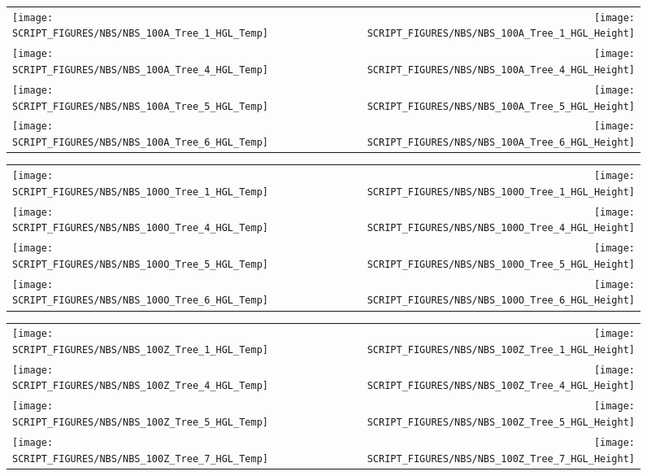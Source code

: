 \begin{figure}[p]
\begin{tabular*}{\textwidth}{l@{\extracolsep{\fill}}r}
\texttt{[image: SCRIPT\_FIGURES/NBS/NBS\_100A\_Tree\_1\_HGL\_Temp]} &
\texttt{[image: SCRIPT\_FIGURES/NBS/NBS\_100A\_Tree\_1\_HGL\_Height]} \\
\texttt{[image: SCRIPT\_FIGURES/NBS/NBS\_100A\_Tree\_4\_HGL\_Temp]} &
\texttt{[image: SCRIPT\_FIGURES/NBS/NBS\_100A\_Tree\_4\_HGL\_Height]} \\
\texttt{[image: SCRIPT\_FIGURES/NBS/NBS\_100A\_Tree\_5\_HGL\_Temp]} &
\texttt{[image: SCRIPT\_FIGURES/NBS/NBS\_100A\_Tree\_5\_HGL\_Height]}\\
\texttt{[image: SCRIPT\_FIGURES/NBS/NBS\_100A\_Tree\_6\_HGL\_Temp]} &
\texttt{[image: SCRIPT\_FIGURES/NBS/NBS\_100A\_Tree\_6\_HGL\_Height]}
\end{tabular*}
\end{figure}

\begin{figure}[p]
\begin{tabular*}{\textwidth}{l@{\extracolsep{\fill}}r}
\texttt{[image: SCRIPT\_FIGURES/NBS/NBS\_100O\_Tree\_1\_HGL\_Temp]} &
\texttt{[image: SCRIPT\_FIGURES/NBS/NBS\_100O\_Tree\_1\_HGL\_Height]} \\
\texttt{[image: SCRIPT\_FIGURES/NBS/NBS\_100O\_Tree\_4\_HGL\_Temp]} &
\texttt{[image: SCRIPT\_FIGURES/NBS/NBS\_100O\_Tree\_4\_HGL\_Height]} \\
\texttt{[image: SCRIPT\_FIGURES/NBS/NBS\_100O\_Tree\_5\_HGL\_Temp]} &
\texttt{[image: SCRIPT\_FIGURES/NBS/NBS\_100O\_Tree\_5\_HGL\_Height]}\\
\texttt{[image: SCRIPT\_FIGURES/NBS/NBS\_100O\_Tree\_6\_HGL\_Temp]} &
\texttt{[image: SCRIPT\_FIGURES/NBS/NBS\_100O\_Tree\_6\_HGL\_Height]}
\end{tabular*}
\end{figure}

\begin{figure}[p]
\begin{tabular*}{\textwidth}{l@{\extracolsep{\fill}}r}
\texttt{[image: SCRIPT\_FIGURES/NBS/NBS\_100Z\_Tree\_1\_HGL\_Temp]} &
\texttt{[image: SCRIPT\_FIGURES/NBS/NBS\_100Z\_Tree\_1\_HGL\_Height]} \\
\texttt{[image: SCRIPT\_FIGURES/NBS/NBS\_100Z\_Tree\_4\_HGL\_Temp]} &
\texttt{[image: SCRIPT\_FIGURES/NBS/NBS\_100Z\_Tree\_4\_HGL\_Height]} \\
\texttt{[image: SCRIPT\_FIGURES/NBS/NBS\_100Z\_Tree\_5\_HGL\_Temp]} &
\texttt{[image: SCRIPT\_FIGURES/NBS/NBS\_100Z\_Tree\_5\_HGL\_Height]}\\
\texttt{[image: SCRIPT\_FIGURES/NBS/NBS\_100Z\_Tree\_7\_HGL\_Temp]} &
\texttt{[image: SCRIPT\_FIGURES/NBS/NBS\_100Z\_Tree\_7\_HGL\_Height]}
\end{tabular*}
\end{figure}


